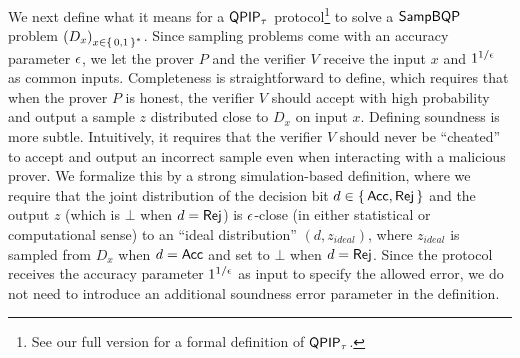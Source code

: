
We next define what it means for a $\operatorname{\mathsf{QPIP}}_\tau$ protocol\footnote{See our full version \cite{full-version} for a formal definition of $\operatorname{\mathsf{QPIP}}_\tau$.} to solve a $\operatorname{\mathsf{SampBQP}}$ problem $\left(D_x\right)_{x\in\set{0, 1}^*}$.
Since sampling problems come with an accuracy parameter $\epsilon$, we let the prover $P$ and the verifier $V$ receive the input $x$ and $1^{1/\epsilon}$ as common inputs. 
Completeness is straightforward to define, which requires that when the prover $P$ is honest, the verifier $V$ should accept with high probability and output a sample $z$ distributed close to $D_x$ on input $x$. Defining soundness is more subtle. Intuitively, it requires that the verifier $V$ should never be ``cheated'' to accept and output an incorrect sample even when interacting with a malicious prover. We formalize this by a strong simulation-based definition, where we require that the joint distribution of the decision bit $d \in \set{\mathsf{Acc}, \mathsf{Rej}}$ and the output $z$ (which is $\bot$ when $d = \mathsf{Rej}$) is $\epsilon$-close (in either statistical or computational sense) to an ``ideal distribution'' $(d,z_{ideal})$, where $z_{ideal}$ is sampled from $D_x$ when $d = \mathsf{Acc}$ and set to $\bot$ when $d = \mathsf{Rej}$. Since the protocol receives the accuracy parameter $1^{1/\epsilon}$ as input to specify the allowed error, we do not need to introduce an additional soundness error parameter in the definition.

